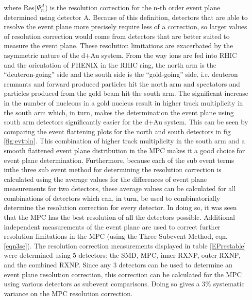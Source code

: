 where Res($\Psi_n^A$) is the resolution correction for the n-th order event plane determined using detector A. Because of this definition, detectors that are able to resolve the event plane more precisely require less of a correction, so larger values of resolution correction would come from detectors that are better suited to measure the event plane. These resolution limitations are exacerbated by the asymmetric nature of the d+Au system. From the way ions are fed into RHIC and the orientation of PHENIX in the RHIC ring, the north arm is the ``deuteron-going'' side and the south side is the ``gold-going'' side, i.e. deuteron remnants and forward produced particles hit the north arm and spectators and particles produced from the gold beam hit the south arm. The significant increase in the number of nucleons in a gold nucleus result in higher track multiplicity in the south arm which, in turn, makes the determination the event plane using south arm detectors significantly easier for the d+Au system. This can be seen by comparing the event flattening plots for the north and south detectors in fig \ref{fig:evtpln}. This combination of higher track multiplicity in the south arm and a smooth flattened event plane distribution in the MPC makes it a good choice for event plane determination. Furthermore, because each of the sub event terms inthe three sub event method for determining the resolution correction is calculated using the average values for the differences of event plane measurements for two detectors, these average values can be calculated for all combinations of detectors which can, in turn, be used to combinatorially determine the resolution correction for every detector. In doing so, it was seen that the MPC has the best resolution of all the detectors possible. Additional independent measurements of the event plane are used to correct further resolution limitations in the MPC (using the Three Subevent Method, eqn. \ref{eqn3se}). The resolution correction measurements displayed in table \ref{EPrestable} were determined using 5 detectors: the SMD, MPC, inner RXNP, outer RXNP, and the combined RXNP. Since any 3 detectors can be used to determine an event plane resolution correction, this correction can be calculated for the MPC using various detectors as subevent comparisons. Doing so gives a 3\% systematic variance on the MPC resolution correction.

